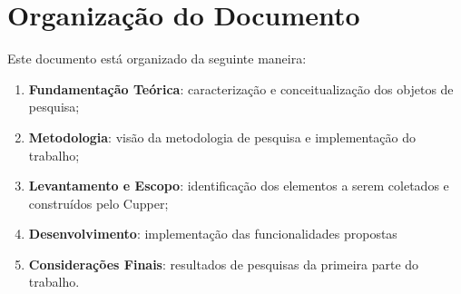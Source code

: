 \section*{Organização do Documento}
\label{sec:org}

Este documento está organizado da seguinte maneira:

\begin{enumerate}
  \item \textbf{Fundamentação Teórica}: caracterização e conceitualização dos
    objetos de pesquisa;
  \item \textbf{Metodologia}: visão da metodologia de pesquisa e implementação
    do trabalho;
  \item \textbf{Levantamento e Escopo}: identificação dos elementos a serem coletados
    e construídos pelo Cupper;
  \item \textbf{Desenvolvimento}: implementação das funcionalidades propostas
  \item \textbf{Considerações Finais}: resultados de pesquisas da primeira
    parte do trabalho.
\end{enumerate}

